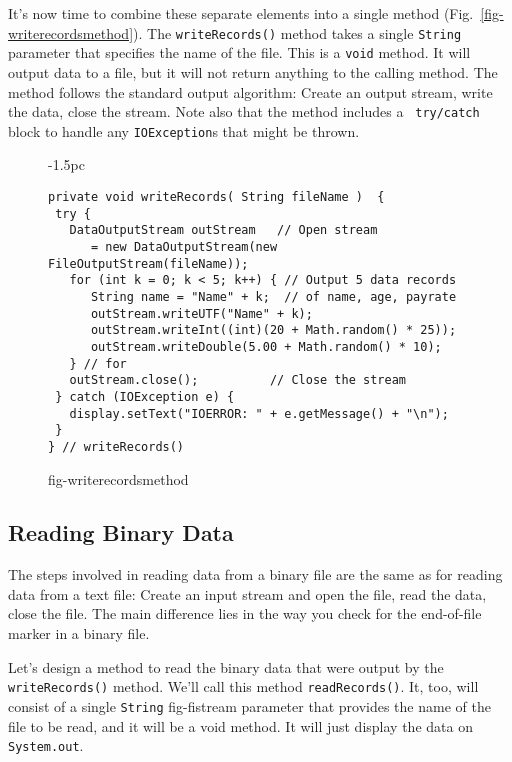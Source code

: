 It's now time to combine these separate elements into a single method
(Fig.~\ref{fig-writerecordsmethod}).  The {\tt writeRecords()} method
takes a single {\tt String} parameter that specifies the name of the
file.  This is a {\tt void} method.  It will output data to a file,
but it will not return anything to the calling method.  The method
follows the standard output algorithm: Create an output stream, write
the data, close the stream.  Note also that the method includes a {\tt
try/catch} block to handle any {\tt IOException}s that might be thrown.
\begin{figure}[h]
\jjjprogstart
\begin{jjjlistingleft}[28.5pc]{-1.5pc}
\begin{lstlisting}
private void writeRecords( String fileName )  {
 try {
   DataOutputStream outStream   // Open stream
      = new DataOutputStream(new FileOutputStream(fileName)); 
   for (int k = 0; k < 5; k++) { // Output 5 data records
      String name = "Name" + k;  // of name, age, payrate
      outStream.writeUTF("Name" + k);          
      outStream.writeInt((int)(20 + Math.random() * 25)); 
      outStream.writeDouble(5.00 + Math.random() * 10);   
   } // for
   outStream.close();          // Close the stream
 } catch (IOException e) {
   display.setText("IOERROR: " + e.getMessage() + "\n");
 }
} // writeRecords()
\end{lstlisting}
\end{jjjlistingleft}
{fig-writerecordsmethod}
\end{figure}


\subsection{Reading Binary Data}
\noindent The steps involved in reading data from a binary file are the
same as for reading data from a text file: Create an input
stream and open the file, read the data, close the file.  The main
difference lies in the way you check for the end-of-file marker
in a binary file.

Let's design a method to read the binary data that were output by the
{\tt writeRecords()} method.  We'll call this method
{\tt readRecords()}. It, too, will consist of a single {\tt String}
{fig-fistream}
parameter that provides the name of the file  to be read, and
it will be a void method.  It will just display the data on
{\tt System.out}.

